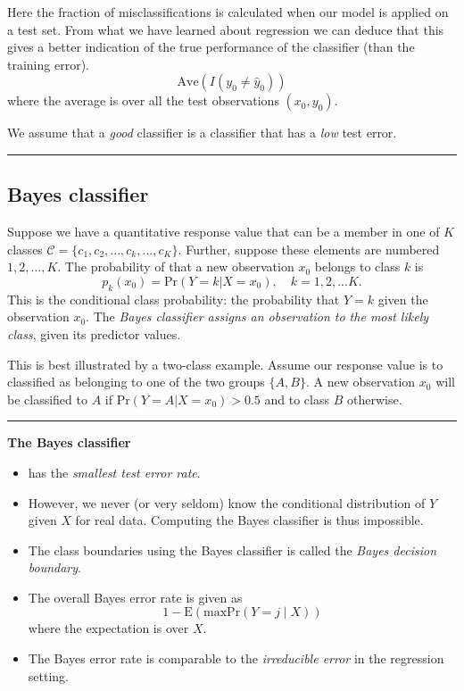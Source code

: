\documentclass[]{article}
\providecommand{\tightlist}{%
  \setlength{\itemsep}{0pt}\setlength{\parskip}{0pt}}
\begin{document}
Here the fraction of misclassifications is calculated when our model is
applied on a test set. From what we have learned about regression we can
deduce that this gives a better indication of the true performance of
the classifier (than the training error).
\[\text{Ave}(I(y_0\neq \hat{y}_0))\] where the average is over all the
test observations \((x_0,y_0)\).

We assume that a \emph{good} classifier is a classifier that has a
\emph{low} test error.

\begin{center}\rule{0.5\linewidth}{\linethickness}\end{center}

\hypertarget{bayes-classifier}{%
\subsection{Bayes classifier}\label{bayes-classifier}}

Suppose we have a quantitative response value that can be a member in
one of \(K\) classes \(\mathcal{C} = \{c_1, c_2, ..., c_k, ..., c_K\}\).
Further, suppose these elements are numbered \(1, 2, ..., K\). The
probability of that a new observation \(x_0\) belongs to class \(k\) is
\[p_k(x_0) = \text{Pr}(Y=k | X=x_0), \quad k = 1, 2, ... K.\] This is
the conditional class probability: the probability that \(Y=k\) given
the observation \(x_0\). The \emph{Bayes classifier assigns an
observation to the most likely class}, given its predictor values.

This is best illustrated by a two-class example. Assume our response
value is to classified as belonging to one of the two groups
\(\{A, B\}\). A new observation \(x_0\) will be classified to \(A\) if
\(\text{Pr}(Y=A | X=x_0) > 0.5\) and to class \(B\) otherwise.

\begin{center}\rule{0.5\linewidth}{\linethickness}\end{center}

\textbf{The Bayes classifier}

\begin{itemize}
\tightlist
\item
  has the \emph{smallest test error rate}.
\item
  However, we never (or very seldom) know the conditional distribution
  of \(Y\) given \(X\) for real data. Computing the Bayes classifier is
  thus impossible.
\item
  The class boundaries using the Bayes classifier is called the
  \emph{Bayes decision boundary}.
\item
  The overall Bayes error rate is given as
  \[1-\text{E}(\text{max} \text{Pr}(Y=j\mid X))\] where the expectation
  is over \(X\).
\item
  The Bayes error rate is comparable to the \emph{irreducible error} in
  the regression setting.
\end{itemize}
\end{document}
